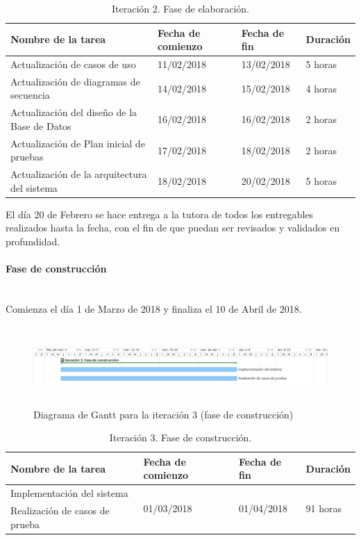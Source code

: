 \documentclass[twoside]{report}
\begin{document}
\begin{table}[H]
\centering
\begin{tabular}{|l|l|l|l|}
\hline
Nombre de la tarea                           & Fecha de comienzo & Fecha de fin & Duración \\ \hline
Actualización de casos de uso                & 11/02/2018        & 13/02/2018   & 5 horas   \\ \hline
Actualización de diagramas de secuencia      & 14/02/2018        & 15/02/2018   & 4 horas   \\ \hline
Actualización del diseño de la Base de Datos & 16/02/2018        & 16/02/2018   & 2 horas   \\ \hline
Actualización de Plan inicial de pruebas     & 17/02/2018        & 18/02/2018   & 2 horas   \\ \hline
Actualización de la arquitectura del sistema & 18/02/2018        & 20/02/2018   & 5 horas   \\ \hline
\end{tabular}
\caption{Iteración 2. Fase de elaboración.}
\end{table}

El día 20 de Febrero se hace entrega a la tutora de todos los entregables realizados hasta la fecha, con el fin de que puedan ser revisados y validados en profundidad.


\paragraph{Fase de construcción}\mbox{}\\

Comienza el día 1 de Marzo de 2018 y finaliza el 10 de Abril de 2018.

\begin{figure}[h]
\begin{center}
\includegraphics[height=3cm,width=\textwidth]{images/gantt/ite3}
\caption{Diagrama de Gantt para la iteración 3 (fase de construcción)}
\end{center}
\end{figure}


\begin{table}[H]
\centering
\begin{tabular}{|l|l|l|l|}
\hline
Nombre de la tarea             & Fecha de comienzo & Fecha de fin & Duración \\ \hline
Implementación del sistema & \multirow{2}{*}{01/03/2018}  & \multirow{2}{*}{01/04/2018}   & \multirow{2}{*}{91 horas}  \\
Realización de casos de prueba & & & \\
\hline
\end{tabular}
\caption{Iteración 3. Fase de construcción.}
\end{table}
\end{document}
